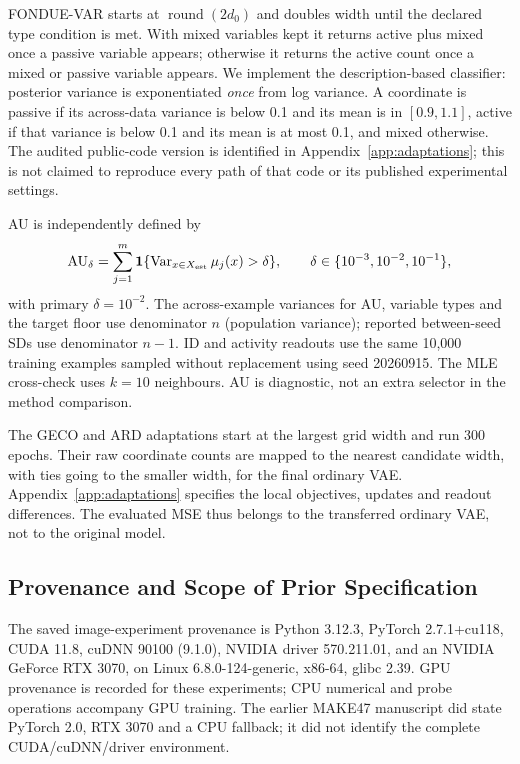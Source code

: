 \documentclass[make,article,submit,pdftex,moreauthors]{Definitions/mdpi}
\begin{document}
FONDUE-VAR starts at $\operatorname{round}(2d_0)$ and doubles width until
the declared type condition is met. With mixed variables kept it returns
active plus mixed once a passive variable appears; otherwise it returns
the active count once a mixed or passive variable appears. We implement
the description-based classifier: posterior variance is exponentiated
\emph{once} from log variance. A coordinate is passive if its across-data
variance is below 0.1 and its mean is in $[0.9,1.1]$, active if that
variance is below 0.1 and its mean is at most 0.1, and mixed otherwise.
The audited public-code version is identified in
Appendix~\ref{app:adaptations}; this is not claimed to reproduce every
path of that code or its published experimental settings.

AU is independently defined by
\begin{equation}
 \mathrm{AU}_\delta=\sum_{j=1}^{m}
 \mathbf1\{\operatorname{Var}_{x\in X_{\rm est}}\mu_j(x)>\delta\},
 \qquad \delta\in\{10^{-3},10^{-2},10^{-1}\},
 \label{eq:au}
\end{equation}
with primary $\delta=10^{-2}$. The across-example variances for AU,
variable types and the target floor use denominator $n$ (population
variance); reported between-seed SDs use denominator $n-1$.
ID and activity readouts use the same
10,000 training examples sampled without replacement using seed
20260915. The MLE cross-check uses $k=10$ neighbours. AU is diagnostic,
not an extra selector in the method comparison.

The GECO and ARD adaptations start at the largest grid width and run
300 epochs. Their raw coordinate counts are mapped to the nearest
candidate width, with ties going to the smaller width, for the final
ordinary VAE. Appendix~\ref{app:adaptations} specifies the local
objectives, updates and readout differences. The evaluated MSE thus
belongs to the transferred ordinary VAE, not to the original model.

\subsection{Provenance and Scope of Prior Specification}\label{sec:provenance}
The saved image-experiment provenance is Python 3.12.3, PyTorch
2.7.1+cu118, CUDA 11.8, cuDNN 90100 (9.1.0), NVIDIA driver 570.211.01,
and an NVIDIA GeForce RTX 3070, on Linux 6.8.0-124-generic, x86-64,
glibc 2.39. GPU provenance is recorded for these experiments; CPU
numerical and probe operations accompany GPU training. The earlier
MAKE47 manuscript did state PyTorch 2.0, RTX 3070 and a CPU fallback;
it did not identify the complete CUDA/cuDNN/driver environment.
\end{document}
